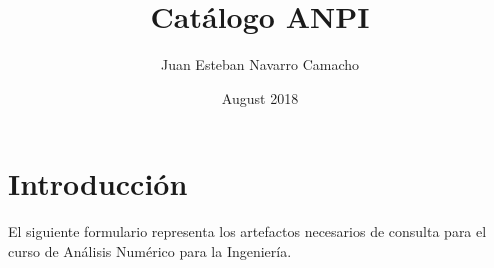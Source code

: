 \documentclass[a4paper]{article}
\title{Catálogo ANPI}
\author{Juan Esteban Navarro Camacho }
\date{August 2018}
\begin{document}
\maketitle
\section{Introducción}
El siguiente formulario representa los artefactos necesarios de consulta para el curso de Análisis Numérico para la Ingeniería.

\begin{multicols}{2}




\end{multicols}


\end{document}

